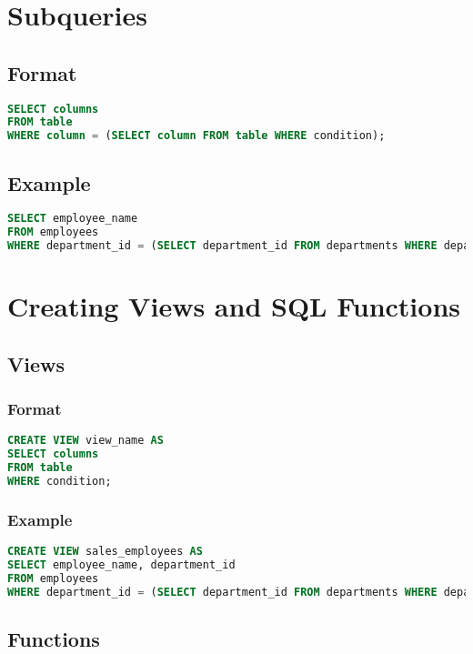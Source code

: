\documentclass{article}
\begin{document}
\newpage
\section{Subqueries}

\subsection{Format}
\begin{lstlisting}[language=SQL]
SELECT columns
FROM table
WHERE column = (SELECT column FROM table WHERE condition);
\end{lstlisting}

\subsection{Example}
\begin{lstlisting}[language=SQL]
SELECT employee_name
FROM employees
WHERE department_id = (SELECT department_id FROM departments WHERE department_name = 'Sales');
\end{lstlisting}

\newpage
\section{Creating Views and SQL Functions}

\subsection{Views}

\subsubsection{Format}
\begin{lstlisting}[language=SQL]
CREATE VIEW view_name AS
SELECT columns
FROM table
WHERE condition;
\end{lstlisting}

\subsubsection{Example}
\begin{lstlisting}[language=SQL]
CREATE VIEW sales_employees AS
SELECT employee_name, department_id
FROM employees
WHERE department_id = (SELECT department_id FROM departments WHERE department_name = 'Sales');
\end{lstlisting}

\subsection{Functions}
\end{document}
